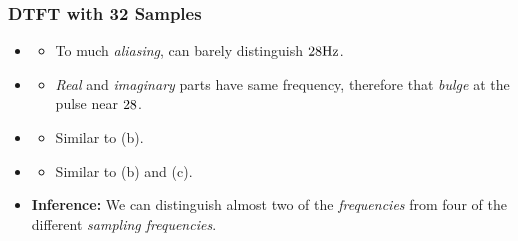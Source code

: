 \documentclass[../../course]{subfiles}
\begin{document}
\subsubsection{DTFT with 32 Samples}

\begin{itemize} [label=]

    \item \sampFreqMuchLess
        \begin{itemize} [label=]
            \item To much \emph{aliasing}, can barely distinguish $\freqXOne \si{Hz}$.
        \end{itemize}

    \item \sampFreqNorm
        \begin{itemize} [label=]
            \item \emph{Real} and \emph{imaginary} parts have same frequency, therefore that \emph{bulge}
                at the pulse near $\freqXOne$.
        \end{itemize}

    \item \sampFreqSligGreat
        \begin{itemize} [label=]
            \item Similar to (b).
        \end{itemize}

    \item \sampFreqMuchGreat
        \begin{itemize} [label=]
            \item Similar to (b) and (c).
        \end{itemize}

    \item \textbf{Inference:} We can distinguish almost two of the \emph{frequencies} from four
        of the different \emph{sampling frequencies}.

\end{itemize}

\vfill
\end{document}
